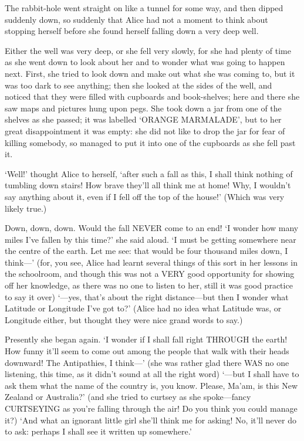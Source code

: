 \documentclass[12pt]{book}
\begin{document}
\begin{Parallel}[p]{}{}
{The rabbit-hole went straight on like a tunnel for some way, and then dipped suddenly down, so suddenly that Alice had not a moment to think about stopping herself before she found herself falling down a very deep well.

Either the well was very deep, or she fell very slowly, for she had plenty of time as she went down to look about her and to wonder what was going to happen next. First, she tried to look down and make out what she was coming to, but it was too dark to see anything; then she looked at the sides of the well, and noticed that they were filled with cupboards and book-shelves; here and there she saw maps and pictures hung upon pegs. She took down a jar from one of the shelves as she passed; it was labelled ‘ORANGE MARMALADE’, but to her great disappointment it was empty: she did not like to drop the jar for fear of killing somebody, so managed to put it into one of the cupboards as she fell past it.

‘Well!’ thought Alice to herself, ‘after such a fall as this, I shall think nothing of tumbling down stairs! How brave they’ll all think me at home! Why, I wouldn’t say anything about it, even if I fell off the top of the house!’ (Which was very likely true.)

Down, down, down. Would the fall NEVER come to an end! ‘I wonder how many miles I’ve fallen by this time?’ she said aloud. ‘I must be getting somewhere near the centre of the earth. Let me see: that would be four thousand miles down, I think—’ (for, you see, Alice had learnt several things of this sort in her lessons in the schoolroom, and though this was not a VERY good opportunity for showing off her knowledge, as there was no one to listen to her, still it was good practice to say it over) ‘—yes, that’s about the right distance—but then I wonder what Latitude or Longitude I’ve got to?’ (Alice had no idea what Latitude was, or Longitude either, but thought they were nice grand words to say.)

Presently she began again. ‘I wonder if I shall fall right THROUGH the earth! How funny it’ll seem to come out among the people that walk with their heads downward! The Antipathies, I think—’ (she was rather glad there WAS no one listening, this time, as it didn’t sound at all the right word) ‘—but I shall have to ask them what the name of the country is, you know. Please, Ma’am, is this New Zealand or Australia?’ (and she tried to curtsey as she spoke—fancy CURTSEYING as you’re falling through the air! Do you think you could manage it?) ‘And what an ignorant little girl she’ll think me for asking! No, it’ll never do to ask: perhaps I shall see it written up somewhere.’

}
\end{Parallel}
\end{document}
